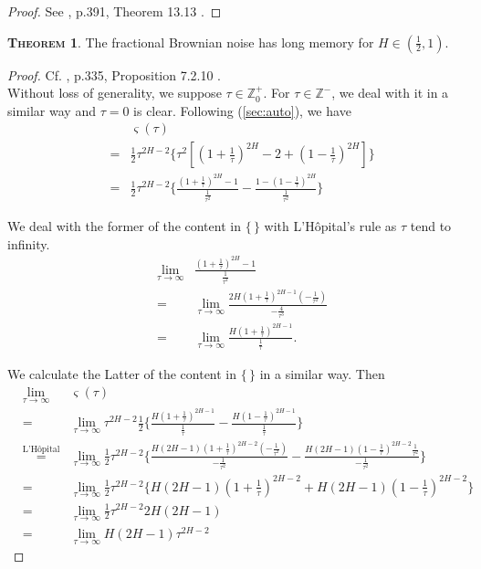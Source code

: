 \documentclass[a4paper, twoside, 11pt]{article}
\theoremstyle{definition}
\newtheorem{theorem}[definition]{\scshape Theorem}
\begin{document}
\begin{proof}
  See \cite{michael}, p.391, Theorem 13.13 .
\end{proof}
\begin{theorem}
  The fractional Brownian noise has long memory for $H \in (\frac{1}{2}, 1)$.
  \label{sec:lmemory}
\end{theorem}
\begin{proof}
  Cf. \cite{nourdin}, p.335, Proposition 7.2.10 .\\
  Without loss of generality, we suppose $\tau \in \mathbb{Z}^+_0$. For $\tau\in\mathbb{Z}^-$, we deal with it in a similar way and $\tau=0$ is clear. Following (\ref{sec:auto}), we have
  \begin{eqnarray*}
  &&\varsigma(\tau) \\
  &=& \frac{1}{2} \tau^{2H-2}\{ \tau^2[(1+\frac{1}{\tau})^{2H} - 2 + (1-\frac{1}{\tau})^{2H}] \} \\
  &=& \frac{1}{2} \tau^{2H-2}\{ \frac{(1+\frac{1}{\tau})^{2H} - 1 } {\frac{1}{\tau^2}} -  \frac{1 - (1-\frac{1}{\tau})^{2H}} {\frac{1}{\tau^2}} \}
\end{eqnarray*}

We deal with the former of the content in $\{\,\}$ with L'H\^opital's rule as $\tau$ tend to infinity.
\begin{eqnarray*}
&\lim\limits_{\tau\rightarrow\infty}&\frac{(1+\frac{1}{\tau})^{2H} - 1 } {\frac{1}{\tau^2}}\\
&=& \lim\limits_{\tau\rightarrow\infty} \frac{2H(1+\frac{1}{\tau})^{2H-1}(-\frac{1}{\tau^2})}{-\frac{4}{\tau^3}} \\
&=&   \lim\limits_{\tau\rightarrow\infty}\frac{H(1+\frac{1}{\tau})^{2H-1}}{\frac{1}{\tau}}.
\end{eqnarray*}

We calculate the Latter of the content in $\{\,\}$ in a similar way. Then
\begin{eqnarray*}
&\lim\limits_{\tau\rightarrow\infty}&\varsigma(\tau)\\
&=&\lim\limits_{\tau\rightarrow\infty} \tau^{2H-2} \frac{1}{2}\{ \frac{H(1 +\frac{1}{\tau})^{2H-1}}{\frac{1}{\tau}} - \frac{H(1-\frac{1}{\tau})^{2H-1}}{\frac{1}{\tau}}\}\\
&\overset{\text{L'H\^opital}}{=}&\lim\limits_{\tau\rightarrow\infty}  \frac{1}{2} \tau^{2H-2}\{\frac{H(2H-1)(1+\frac{1}{\tau})^{2H-2}(-\frac{1}{\tau^2})}{-\frac{1}{\tau^2}} - \frac{H(2H-1)(1-\frac{1}{\tau})^{2H-2}\frac{1}{\tau^2}}{-\frac{1}{\tau^2}}\}\\
&=& \lim\limits_{\tau\rightarrow\infty} \frac{1}{2} \tau^{2H-2}\{H(2H-1)(1+\frac{1}{\tau})^{2H-2} + H(2H-1)(1-\frac{1}{\tau})^{2H-2}\}\\
&=& \lim\limits_{\tau\rightarrow\infty}\frac{1}{2} \tau^{2H-2} 2H(2H-1)\\
&=& \lim\limits_{\tau\rightarrow\infty} H(2H-1) \tau^{2H-2}
\end{eqnarray*}



\end{proof}
\end{document}
